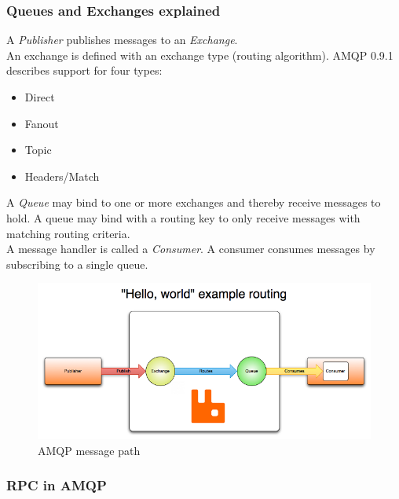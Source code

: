 \subsubsection{Queues and Exchanges explained}
A \textit{Publisher} publishes messages to an \textit{Exchange}.\\
An exchange is defined with an exchange type (routing algorithm). AMQP 0.9.1 describes support for four types\cite{Amqp091References}:
\begin{itemize}
\item Direct
\item Fanout
\item Topic
\item Headers/Match
\end{itemize}
A \textit{Queue} may bind to one or more exchanges and thereby receive messages to hold. A queue may bind with a routing key to only receive messages with matching routing criteria.\\
A message handler is called a \textit{Consumer}. A consumer consumes messages by subscribing to a single queue.
\begin{figure}[H]
  \includegraphics[width=\textwidth]{illustrations/publisher-exchange-queue-consumer.png}
  \caption{AMQP message path\cite{AmqpConcepts}}
\end{figure}

\subsubsection{RPC in AMQP}
\newpage
